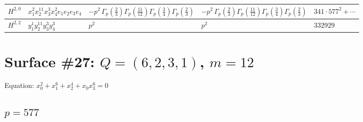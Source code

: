 \documentclass[11pt]{article}
\begin{document}
\begin{table}[ht]
{\begin{tabular}{@{}lllll@{}}
\midrule
$H^{2,0}$ & $x_{1}^{2} x_{2}^{11} x_{3}^{3} x_{4}^{2}  e_{1} e_{2} e_{3} e_{4}$ & $- p^{2} \, \Gamma_p \left( \frac{2}{3} \right) \Gamma_p \left( \frac{11}{12} \right) \Gamma_p \left( \frac{3}{4} \right) \Gamma_p \left( \frac{2}{3} \right)$ & $- p^{2} \, \Gamma_p \left( \frac{2}{3} \right) \Gamma_p \left( \frac{11}{12} \right) \Gamma_p \left( \frac{3}{4} \right) \Gamma_p \left( \frac{2}{3} \right)$ & $341{\cdot}577^{2}{+}\cdots$ \\
\midrule
$H^{2,2}$ & $y_{1}^{1} y_{2}^{11} y_{3}^{3} y_{4}^{3}$ & $p^{2} \,$ & $p^{2} \,$ & $332929$ \\
\bottomrule
\end{tabular}
}
\renewcommand{\arraystretch}{1.0}
\end{table}

\newpage

\section*{Surface \#27: $Q=(6, 2, 3, 1)$, $m=12$}

Equation: $x_0^{2} + x_1^{6} + x_2^{4} + x_0 x_3^{6} = 0$

\subsection*{$p = 577$}
\end{document}
